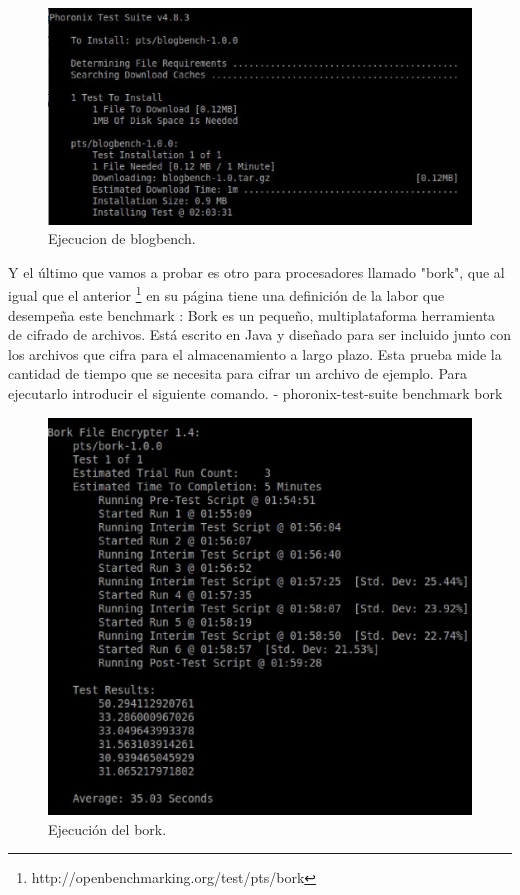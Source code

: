 \begin{figure}[H]
\begin{center}
\includegraphics[scale=0.4]{imagenes/opcional1-1.eps}
\caption{Ejecucion de blogbench.}
\end{center}
\end{figure}



Y el último que vamos a probar es otro para procesadores llamado 
"bork", que al igual que el anterior \footnote{http://openbenchmarking.org/test/pts/bork} en su página tiene una definición de la labor que desempeña este benchmark : Bork es un pequeño, multiplataforma herramienta de cifrado de archivos. Está escrito en Java y diseñado para ser incluido junto con los archivos que cifra para el almacenamiento a largo plazo. Esta prueba mide la cantidad de tiempo que se necesita para cifrar un archivo de ejemplo.
Para ejecutarlo introducir el siguiente comando.
- phoronix-test-suite benchmark bork 
\begin{figure}[H]
\begin{center}
\includegraphics[scale=0.4]{imagenes/opcional1-2.eps}
\caption{Ejecución del bork.}
\end{center}
\end{figure}


